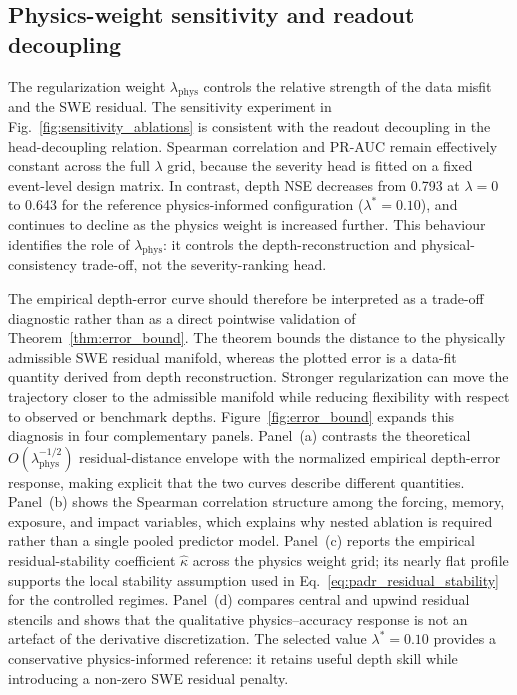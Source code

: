 \documentclass[pdflatex,sn-mathphys-ay]{sn-jnl}
\theoremstyle{thmstyleone}
\begin{document}
\subsection{Physics-weight sensitivity and readout decoupling}
\label{subsec:lambda_ablation_results}

The regularization weight $\lambda_{\mathrm{phys}}$ controls the
relative strength of the data misfit and the SWE residual.  The
sensitivity experiment in Fig.~\ref{fig:sensitivity_ablations} is
consistent with the readout decoupling in
the head-decoupling relation.  Spearman correlation and
PR-AUC remain effectively constant across the full $\lambda$ grid,
because the severity head is fitted on a fixed event-level design
matrix.  In contrast, depth NSE decreases from 0.793 at $\lambda=0$ to
0.643 for the reference physics-informed configuration
($\lambda^{*}=0.10$), and continues to decline as the physics weight is
increased further.  This behaviour identifies the role of
$\lambda_{\mathrm{phys}}$: it controls the depth-reconstruction and
physical-consistency trade-off, not the severity-ranking head.

The empirical depth-error curve should therefore be interpreted as a
trade-off diagnostic rather than as a direct pointwise validation of
Theorem~\ref{thm:error_bound}.  The theorem bounds the distance to the
physically admissible SWE residual manifold, whereas the plotted error
is a data-fit quantity derived from depth reconstruction.  Stronger
regularization can move the trajectory closer to the admissible
manifold while reducing flexibility with respect to observed or
benchmark depths.  Figure~\ref{fig:error_bound} expands this diagnosis
in four complementary panels.  Panel~(a) contrasts the theoretical
$O(\lambda_{\mathrm{phys}}^{-1/2})$ residual-distance envelope with the
normalized empirical depth-error response, making explicit that the two
curves describe different quantities.  Panel~(b) shows the Spearman
correlation structure among the forcing, memory, exposure, and impact
variables, which explains why nested ablation is required rather than a
single pooled predictor model.  Panel~(c) reports the empirical
residual-stability coefficient $\widehat{\kappa}$ across the physics
weight grid; its nearly flat profile supports the local stability
assumption used in Eq.~\eqref{eq:padr_residual_stability} for the
controlled regimes.  Panel~(d) compares central and upwind residual
stencils and shows that the qualitative physics--accuracy response is
not an artefact of the derivative discretization.  The selected value
$\lambda^{*}=0.10$ provides a conservative physics-informed reference:
it retains useful depth skill while introducing a non-zero SWE residual
penalty.
\end{document}
